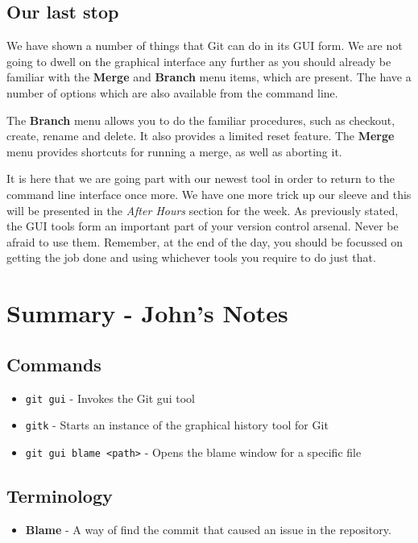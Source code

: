 \subsection{Our last stop}
We have shown a number of things that Git can do in its GUI form.  We are not going to dwell on the graphical interface any further as you should already be familiar with the \textbf{Merge} and \textbf{Branch} menu items, which are present.  The have a number of options which are also available from the command line.  

The \textbf{Branch} menu allows you to do the familiar procedures, such as checkout, create, rename and delete.  It also provides a limited reset feature.  The \textbf{Merge} menu provides shortcuts for running a merge, as well as aborting it.  

It is here that we are going part with our newest tool in order to return to the command line interface once more.  We have one more trick up our sleeve and this will be presented in the \emph{After Hours} section for the week.  As previously stated, the GUI tools form an important part of your version control arsenal.  Never be afraid to use them.  Remember, at the end of the day, you should be focussed on getting the job done and using whichever tools you require to do just that.

\clearpage

\section{Summary - John's Notes}
\subsection{Commands}
\begin{itemize}

\item\texttt{git gui} - Invokes the Git gui tool

\item\texttt{gitk} - Starts an instance of the graphical history tool for Git

\item\texttt{git gui blame <path>} - Opens the blame window for a specific file

\end{itemize}

\subsection{Terminology}
\begin{itemize}

\item\textbf{Blame} - A way of find the commit that caused an issue in the repository.
\end{itemize}
